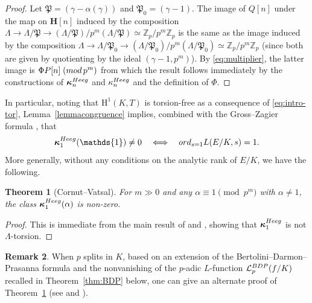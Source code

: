 \documentclass[10pt,reqno]{amsart}
\numberwithin{equation}{section}
\theoremstyle{plain}
\newtheorem{thm}{Theorem}[subsection] %
\theoremstyle{definition}
\newtheorem{rmk}[thm]{Remark}
\theoremstyle{definition}
\theoremstyle{plain}
\theoremstyle{plain}
\theoremstyle{plain}
\theoremstyle{plain}
\theoremstyle{plain}
\theoremstyle{plain}
\newcommand{\Z}{\mathbb{Z}}
\newcommand{\p}{\mathfrak{P}}
\newcommand{\bkappa}{\boldsymbol{\kappa}}
\newcommand{\Fcal}{\mathcal{F}}
\newcommand{\rH}{\mathrm{H}}
\begin{document}
\begin{proof}
Let $\p = (\gamma - \alpha(\gamma))$ and $\p_0 = (\gamma-1)$.
The image of $Q[n]$ under the map on $\mathbf{H}[n]$ induced by the composition $\Lambda\to \Lambda/\p\to (\Lambda/\p)/p^m(\Lambda/\p)\simeq \Z_p/p^m\Z_p$ is the same as the image induced by the composition $\Lambda \to \Lambda/\p_0 \to(\Lambda/\p_0)/p^m(\Lambda/\p_0)\simeq \Z_p/p^m\Z_p$ (since both are given by quotienting by the ideal $(\gamma-1,p^m)$).
By \eqref{eq:multiplier}, the latter image is $\Phi P[n]\;({\rm mod}\,p^m)$ from which the result follows immediately by the constructions of $\bkappa_{n}^{\rm Heeg}$ and $\kappa_n^{\rm Heeg}$ and the definition of $\Phi$.
\end{proof}

In particular, noting that $\rH^1(K,T)$ is torsion-free as a consequence of \eqref{eq:intro-tor}, Lemma~\ref{lemmacongruence} implies, combined with the Gross--Zagier formula \cite{grosszagier}, that 
\[
\bkappa_1^{\rm Heeg}(\mathds{1})\neq 0\quad\Longleftrightarrow\quad{\rm ord}_{s=1}L(E/K,s)=1.
\] 
More generally, without any conditions on the analytic rank of $E/K$, we have the following. 


\begin{thm}[Cornut--Vatsal]\label{thmCV}
For $m\gg 0$ and any $\alpha\equiv 1 \pmod{p^m}$ with $\alpha \neq 1$, the class $\bkappa_1^{\rm Heeg}(\alpha)$ is non-zero.
\end{thm} 

\begin{proof}
This is immediate from the main result of \cite{cornut} and \cite{vatsal}, showing that $\bkappa_{1}^{\rm Heeg}$ is not $\Lambda$-torsion.
\end{proof} 

\begin{rmk}
When $p$ splits in $K$, based on an extension of the Bertolini--Darmon--Prasanna formula and the nonvanishing of the $p$-adic $L$-function $\mathcal{L}_p^{\rm BDP}(f/K)$ recalled in Theorem~\ref{thm:BDP} below, one can give an alternate proof of Theorem~\ref{thmCV} (see \cite{cas-hsieh1} and \cite{bu}).
\end{rmk}
\end{document}
